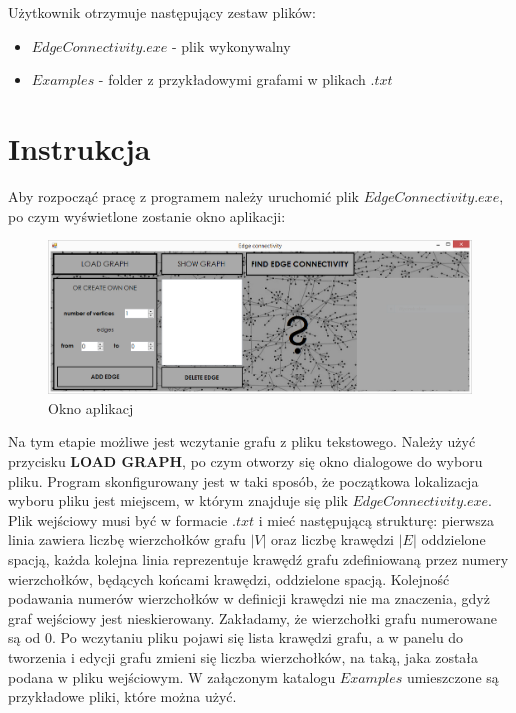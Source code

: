 \documentclass{article}
\begin{document}
Użytkownik otrzymuje następujący zestaw plików:

\begin{itemize}
    \item $EdgeConnectivity.exe$ - plik wykonywalny
    \item $Examples$ - folder z przykładowymi grafami w plikach $.txt$
\end{itemize}



\section{Instrukcja}

Aby rozpocząć pracę z programem należy uruchomić plik $EdgeConnectivity.exe$, po czym wyświetlone zostanie okno aplikacji:
 
\begin{figure}[H]
\centering
\includegraphics[scale=0.4]{01}
\caption{Okno aplikacj}
\end{figure}


Na tym etapie możliwe jest wczytanie grafu z pliku tekstowego. Należy użyć przycisku \textbf{LOAD GRAPH}, po czym otworzy się okno dialogowe do wyboru pliku. Program skonfigurowany jest w taki sposób, że początkowa lokalizacja wyboru pliku jest miejscem, w którym znajduje się plik $EdgeConnectivity.exe$. Plik wejściowy musi być w formacie $.txt$ i mieć następującą strukturę:  pierwsza linia zawiera liczbę wierzchołków grafu $|V|$ oraz liczbę krawędzi $|E|$ oddzielone spacją, każda kolejna linia reprezentuje krawędź grafu zdeﬁniowaną przez numery wierzchołków, będących końcami krawędzi, oddzielone spacją. Kolejność podawania numerów wierzchołków w deﬁnicji krawędzi nie ma znaczenia, gdyż graf wejściowy jest nieskierowany. Zakładamy, że wierzchołki grafu numerowane są od 0.
Po wczytaniu pliku pojawi się lista krawędzi grafu, a w panelu do tworzenia i edycji grafu zmieni się liczba wierzchołków, na taką, jaka została podana w pliku wejściowym. W załączonym katalogu $Examples$ umieszczone są przykładowe pliki, które można użyć.
 
\end{document}
